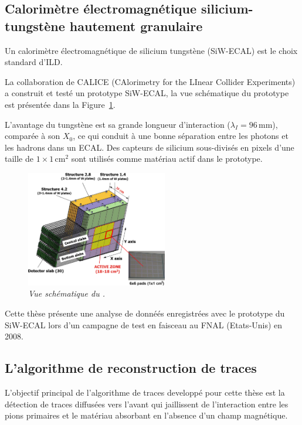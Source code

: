 \subsection*{Calorim\`etre \'electromagn\'etique silicium-tungst\`ene hautement granulaire}

Un calorim\`etre \'electromagn\'etique de silicium tungst\`ene (SiW-ECAL) est le
choix standard d'ILD.

La collaboration de CALICE (CAlorimetry for the LInear Collider Experiments) a construit et testé un prototype SiW-ECAL, la vue schématique du prototype est présentée dans la Figure~\ref {fig:ECAL-schemeF}.

L'avantage du tungstène est sa grande longueur d'interaction ($\lambda_I = 96$\,mm), compar\'ee \`a son $X_0$, ce qui conduit \`a une bonne s\'eparation entre les photons et les hadrons dans un ECAL. 
Des capteurs de silicium sous-divisés en pixels d'une taille de $1\times1$\,cm$^2$ sont utilisés  comme mat\'eriau actif dans le prototype. 
\begin{figure}
	\centering
	\includegraphics[width=0.55\textwidth]{ECAL/graphics/ecal-new.png}
	\caption{\label{fig:ECAL-schemeF} \sl  Vue sch\'ematique du \ecal.}
\end{figure}

Cette thèse présente une analyse de donnéés enregistrées avec le prototype du SiW-ECAL lors d'un campagne de test en faisceau au FNAL (Etats-Unis) en 2008.  
\newpage
\subsection*{L'algorithme de reconstruction de traces}
L'objectif principal de l'algorithme de traces developpé pour cette thèse est la détection de traces diffusées vers l'avant qui jaillissent de l'interaction entre les pions primaires et le matériau absorbant en l'absence d'un champ magnétique.

